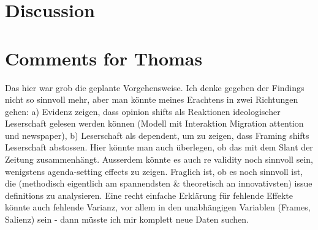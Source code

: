 \documentclass{article}
\begin{document}
\section{Discussion}

\newpage

\section{Comments for Thomas}

Das hier war grob die geplante Vorgehensweise. Ich denke gegeben der Findings nicht so sinnvoll mehr, aber man könnte meines Erachtens in zwei Richtungen gehen: a) Evidenz zeigen, dass opinion shifts als Reaktionen ideologischer Leserschaft gelesen werden können (Modell mit Interaktion Migration attention und newspaper), b) Leserschaft als dependent, um zu zeigen, dass Framing shifts Leserschaft abstossen. Hier könnte man auch überlegen, ob das mit dem Slant der Zeitung zusammenhängt. Ausserdem könnte es auch re validity noch sinnvoll sein, wenigstens agenda-setting effects zu zeigen. Fraglich ist, ob es noch sinnvoll ist, die (methodisch eigentlich am spannendsten \& theoretisch an innovativsten) issue definitions zu analysieren. Eine recht einfache Erklärung für fehlende Effekte könnte auch fehlende Varianz, vor allem in den unabhängigen Variablen (Frames, Salienz) sein - dann  müsste ich mir komplett neue Daten suchen.
\end{document}
